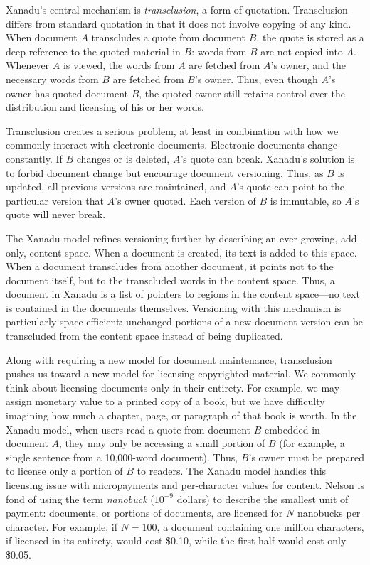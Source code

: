\documentclass{acm_proc_article-sp}
\begin{document}
Xanadu's central mechanism is \textit{transclusion}, a form of quotation.  
Transclusion differs from standard quotation in that it does not involve copying of any kind.  
When document $A$ transcludes a quote from document $B$, the quote is stored as a deep reference to the quoted material in $B$:  words from $B$ are not copied into $A$. 
Whenever $A$ is viewed, the words from $A$ are fetched from $A$'s owner, and the necessary words from $B$ are fetched from $B$'s owner.
Thus, even though $A$'s owner has quoted document $B$, the quoted owner still retains control over the distribution and licensing of his or her words.

Transclusion creates a serious problem, at least in combination with how we commonly interact with electronic documents.
Electronic documents change constantly.
If $B$ changes or is deleted, $A$'s quote can break.
Xanadu's solution is to forbid document change but encourage document versioning.
Thus, as $B$ is updated, all previous versions are maintained, and $A$'s quote can point to the particular version that $A$'s owner quoted.
Each version of $B$ is immutable, so $A$'s quote will never break.

The Xanadu model refines versioning further by describing an ever-growing, add-only, content space.  
When a document is created, its text is added to this space.
When a document transcludes from another document, it points not to the document itself, but to the transcluded words in the content space.
Thus, a document in Xanadu is a list of pointers to regions in the content space---no text is contained in the documents themselves.
Versioning with this mechanism is particularly space-efficient:  unchanged portions of a new document version can be transcluded from the content space instead of being duplicated.

Along with requiring a new model for document maintenance, transclusion pushes us toward a new model for licensing copyrighted material.
We commonly think about licensing documents only in their entirety.
For example, we may assign monetary value to a printed copy of a book, but we have difficulty imagining how much a chapter, page, or paragraph of that book is worth.
In the Xanadu model, when users read a quote from document $B$ embedded in document $A$, they may only be accessing a small portion of $B$ (for example, a single sentence from a 10,000-word document).
Thus, $B$'s owner must be prepared to license only a portion of $B$ to readers.
The Xanadu model handles this licensing issue with micropayments and per-character values for content.
Nelson is fond of using the term \textit{nanobuck} ($10^{-9}$ dollars) to describe the smallest unit of payment:  documents, or portions of documents, are licensed for $N$ nanobucks per character.
For example, if $N=100$, a document containing one million characters, if licensed in its entirety, would cost \$0.10, while the first half would cost only \$0.05.
\end{document}
